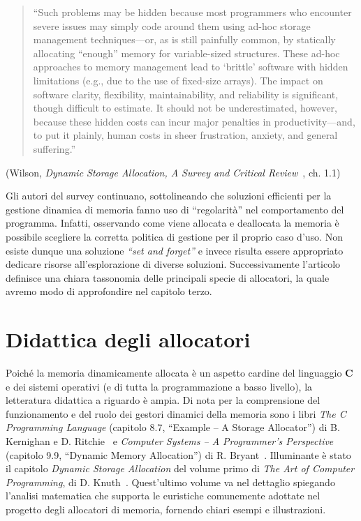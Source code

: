 \begin{quote}
``Such problems may be hidden because most programmers who encounter severe issues may simply code around them using ad-hoc storage management techniques---or, as is still painfully common, by statically allocating ``enough'' memory for variable-sized structures. These ad-hoc approaches to memory management lead to `brittle' software with hidden limitations (e.g., due to the use of fixed-size arrays). The impact on software clarity, flexibility, maintainability, and reliability is significant, though difficult to estimate. It should not be underestimated, however, because these hidden costs can incur major penalties in productivity---and, to put it plainly, human costs in sheer frustration, anxiety, and general suffering.''
\end{quote}
\begin{flushright}
(Wilson, \textit{Dynamic Storage Allocation, A Survey and Critical Review}~\cite{wilson1995}, ch. 1.1)
\end{flushright}

Gli autori del survey continuano, sottolineando che soluzioni efficienti per la gestione dinamica di memoria fanno uso di ``regolarità'' nel comportamento del programma. Infatti, osservando come viene allocata e deallocata la memoria è possibile scegliere la corretta politica di gestione per il proprio caso d’uso. Non esiste dunque una soluzione \textit{``set and forget''} e invece risulta essere appropriato dedicare risorse all’esplorazione di diverse soluzioni. Successivamente l’articolo definisce una chiara tassonomia delle principali specie di allocatori, la quale avremo modo di approfondire nel capitolo terzo.

\section{Didattica degli allocatori}

Poiché la memoria dinamicamente allocata è un aspetto cardine del linguaggio \textbf{C} e dei sistemi operativi (e di tutta la programmazione a basso livello), la letteratura didattica a riguardo è ampia. Di nota per la comprensione del funzionamento e del ruolo dei gestori dinamici della memoria sono i libri \textit{The C Programming Language} (capitolo 8.7, ``Example – A Storage Allocator'') di B. Kernighan e D. Ritchie~\cite{kernighan1988} e \textit{Computer Systems – A Programmer’s Perspective} (capitolo 9.9, ``Dynamic Memory Allocation'') di R. Bryant~\cite{bryant2015}. Illuminante è stato il capitolo \textit{Dynamic Storage Allocation} del volume primo di \textit{The Art of Computer Programming}, di D. Knuth~\cite{knuth1997}. Quest’ultimo volume va nel dettaglio spiegando l’analisi matematica che supporta le euristiche comunemente adottate nel progetto degli allocatori di memoria, fornendo chiari esempi e illustrazioni.

